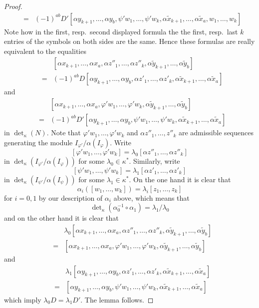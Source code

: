 \begin{proof}
\begin{eqnarray*}
& = &
(-1)^{ab} D'
[\alpha y_{k + 1}, \ldots, \alpha y_b,
\psi' w_1, \ldots, \psi' w_k,
\alpha \tilde x_{k + 1}, \ldots, \alpha \tilde x_a,
w_1, \ldots, w_k]
\end{eqnarray*}
Note how in the first, resp.\ second displayed formula the
the first, resp.\ last $k$ entries of the symbols on both sides
are the same. Hence these formulas are really equivalent to the
equalities
\begin{eqnarray*}
& &
[\alpha x_{k + 1}, \ldots, \alpha x_a,
\alpha z''_1, \ldots, \alpha z''_k,
\alpha \tilde y_{k + 1}, \ldots, \alpha \tilde y_b] \\
& = &
(-1)^{ab} D
[\alpha y_{k + 1}, \ldots, \alpha y_b,
\alpha z'_1, \ldots, \alpha z'_k,
\alpha \tilde x_{k + 1}, \ldots, \alpha \tilde x_a]
\end{eqnarray*}
and
\begin{eqnarray*}
& &
[\alpha x_{k + 1}, \ldots, \alpha x_a,
\varphi' w_1, \ldots, \varphi' w_k,
\alpha \tilde y_{k + 1}, \ldots, \alpha \tilde y_b]
\\
& = &
(-1)^{ab} D'
[\alpha y_{k + 1}, \ldots, \alpha y_b,
\psi' w_1, \ldots, \psi' w_k,
\alpha \tilde x_{k + 1}, \ldots, \alpha \tilde x_a]
\end{eqnarray*}
in $\det_\kappa(N)$. Note that
$\varphi' w_1, \ldots, \varphi' w_k$
and
$\alpha z''_1, \ldots, z''_k$
are admissible sequences generating the module
$I_{\varphi'}/\alpha(I_\varphi)$. Write
$$
[\varphi' w_1, \ldots, \varphi' w_k]
= \lambda_0 [\alpha z''_1, \ldots, \alpha z''_k]
$$
in $\det_\kappa(I_{\varphi'}/\alpha(I_\varphi))$
for some $\lambda_0 \in \kappa^*$. Similarly,
write
$$
[\psi' w_1, \ldots, \psi' w_k]
= \lambda_1 [\alpha z'_1, \ldots, \alpha z'_k]
$$
in $\det_\kappa(I_{\psi'}/\alpha(I_\psi))$
for some $\lambda_1 \in \kappa^*$. On the one hand
it is clear that
$$
\alpha_i([w_1, \ldots, w_k]) = \lambda_i[z_1, \ldots, z_k]
$$
for $i = 0, 1$ by our description of $\alpha_i$ above,
which means that
$$
\det\nolimits_\kappa(\alpha_0^{-1} \circ \alpha_1)
=
\lambda_1/\lambda_0
$$
and
on the other hand it is clear that
\begin{eqnarray*}
& &
\lambda_0 [\alpha x_{k + 1}, \ldots, \alpha x_a,
\alpha z''_1, \ldots, \alpha z''_k,
\alpha \tilde y_{k + 1}, \ldots, \alpha \tilde y_b] \\
& = &
[\alpha x_{k + 1}, \ldots, \alpha x_a,
\varphi' w_1, \ldots, \varphi' w_k,
\alpha \tilde y_{k + 1}, \ldots, \alpha \tilde y_b]
\end{eqnarray*}
and
\begin{eqnarray*}
& &
\lambda_1[\alpha y_{k + 1}, \ldots, \alpha y_b,
\alpha z'_1, \ldots, \alpha z'_k,
\alpha \tilde x_{k + 1}, \ldots, \alpha \tilde x_a] \\
& = &
[\alpha y_{k + 1}, \ldots, \alpha y_b,
\psi' w_1, \ldots, \psi' w_k,
\alpha \tilde x_{k + 1}, \ldots, \alpha \tilde x_a]
\end{eqnarray*}
which imply $\lambda_0 D = \lambda_1 D'$. The lemma follows.
\end{proof}








